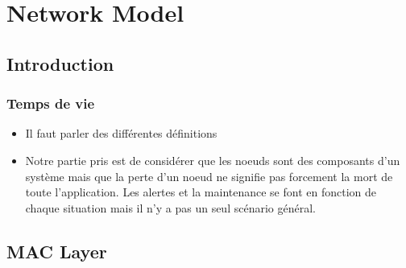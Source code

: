 
\chapter{Network Model} %
\label{cha:network_model}

\section{Introduction} %
\label{sec:introduction}


\subsection{Temps de vie} %
\label{sub:temps_de_vie}

\begin{itemize}
	\item Il faut parler des différentes définitions
	
	\item Notre partie pris est de considérer que les noeuds sont des composants
	d'un système mais que la perte d'un noeud ne signifie pas forcement la mort de toute
	l'application. Les alertes et la maintenance se font en fonction de chaque situation
	mais il n'y a pas un seul scénario général.

\end{itemize}






\section{MAC Layer} %
\label{sec:mac_layer}

\lipsum


